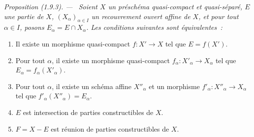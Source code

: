 \documentclass[10pt,oneside]{book}
\makeatletter
\newcommand{\setmanualcurrentlabel}[1]{\def\@currentlabel{#1}}
\newenvironment{proposition}[1][]{%
  \setmanualcurrentlabel{#1}\par\medskip\noindent\itshape Proposition (#1). ---\ }{\par}
\makeatother
\begin{document}
\begin{proposition}[1.9.3]
\label{IV.1.9.3-fr}
Soient $X$ un préschéma quasi-compact et quasi-séparé, $E$ une partie de $X$,
$(X_\alpha)_{\alpha\in I}$ un recouvrement ouvert affine de $X$, et pour
tout $\alpha\in I$, posons $E_\alpha=E\cap X_\alpha$. Les conditions
suivantes sont équivalentes~:
\begin{enumerate}
  \item[a)] Il existe un morphisme quasi-compact $f:X'\to X$ tel que
  $E=f(X')$.
  \item[a$'$)] Pour tout $\alpha$, il existe un morphisme quasi-compact
  $f_\alpha:X'_\alpha\to X_\alpha$ tel que
  $E_\alpha=f_\alpha(X'_\alpha)$.
  \item[a$''$)] Pour tout $\alpha$, il existe un schéma affine $X''_\alpha$
  et un morphisme $f'_\alpha:X''_\alpha\to X_\alpha$ tel que
  $f'_\alpha(X''_\alpha)=E_\alpha$.
  \item[b)] $E$ est intersection de parties constructibles de $X$.
  \item[b$'$)] $F=X-E$ est réunion de parties constructibles de $X$.
\end{enumerate}
\end{proposition}
\end{document}
